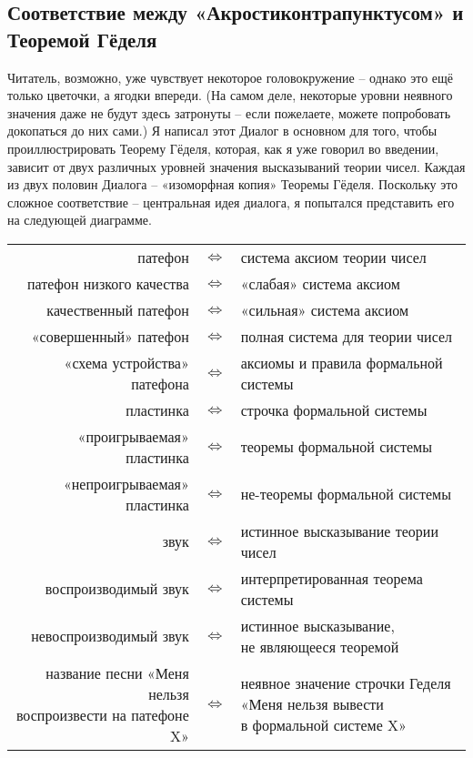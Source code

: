 \documentclass[../main.tex]{subfiles}
\begin{document}
\subsection{Соответствие между «Акростиконтрапунктусом» и Теоремой Гёделя}

Читатель, возможно, уже чувствует некоторое головокружение \--- однако это ещё только цветочки, а ягодки впереди. (На самом деле, некоторые уровни неявного значения даже не будут здесь затронуты \--- если пожелаете, можете попробовать докопаться до них сами.) Я написал этот Диалог в основном для того, чтобы проиллюстрировать Теорему Гёделя, которая, как я уже говорил во введении, зависит от двух различных уровней значения высказываний теории чисел. Каждая из двух половин Диалога \--- «изоморфная копия» Теоремы Гёделя. Поскольку это сложное соответствие \--- центральная идея диалога, я попытался представить его на следующей диаграмме.

\begin{center}
\setlength{\tabcolsep}{6pt}
\noindent%
\begin{tabular}{ @{} r c l @{} }
    патефон &$\Longleftrightarrow$& система аксиом теории чисел \\
    патефон низкого качества &$\Longleftrightarrow$& «слабая» система аксиом \\
    качественный патефон &$\Longleftrightarrow$& «сильная» система аксиом \\
    «совершенный» патефон &$\Longleftrightarrow$& полная система для теории чисел \\
    «схема устройства» патефона &$\Longleftrightarrow$& аксиомы и правила формальной системы \\
    пластинка &$\Longleftrightarrow$& строчка формальной системы \\
    «проигрываемая» пластинка &$\Longleftrightarrow$& теоремы формальной системы \\
    «непроигрываемая» пластинка &$\Longleftrightarrow$& не-теоремы формальной системы \\
    звук &$\Longleftrightarrow$& истинное высказывание теории чисел \\
    воспроизводимый звук &$\Longleftrightarrow$& интерпретированная теорема системы \\
    невоспроизводимый звук &$\Longleftrightarrow$& \makecell[lt]{истинное высказывание, \\ не являющееся теоремой} \\
    \makecell[rt]{название песни «Меня нельзя \\ воспроизвести на патефоне X»}
    &$\Longleftrightarrow$& \makecell[lt]{неявное значение строчки Геделя \\ «Меня нельзя вывести \\ в формальной системе X»} \\
\end{tabular}
\end{center}
\end{document}
